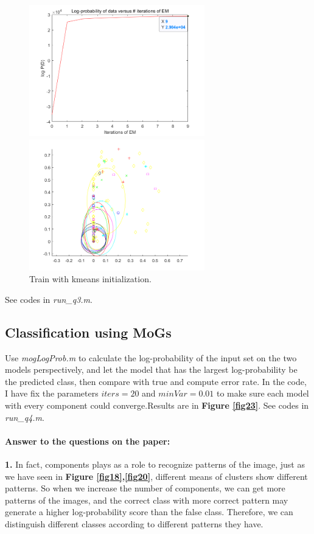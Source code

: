 \documentclass{article}
\begin{document}
\begin{figure}[H]
\begin{minipage}[t]{0.5\linewidth}
\centering
\includegraphics[width=3in]{figure22_1}
\end{minipage}%
\begin{minipage}[t]{0.5\linewidth}
\centering
\includegraphics[width=3in]{figure22_2}
\end{minipage}
\caption{Train with kmeans initialization.}
\label{fig22}
\end{figure}
See codes in \textit{run\_q3.m}.

\subsection{Classification using MoGs}
Use \textit{mogLogProb.m} to calculate the log-probability of the input set on the two models perspectively, and let the model that has the largest log-probability be the predicted class, then compare with true and compute error rate. In the code, I have fix the parameters $iters=20$ and $minVar=0.01$ to make sure each model with every component could converge.Results are in \textbf{Figure \ref{fig23}}. See codes in \textit{run\_q4.m}.\par


\paragraph{Answer to the questions on the paper:}\quad\par
\textbf{1.} In fact, components plays as a role to recognize patterns of the image, just as we have seen in \textbf{Figure \ref{fig18},\ref{fig20}}, different means of clusters show different patterns. So when we increase the number of components, we can get more patterns of the images, and the correct class with more correct pattern may generate a higher log-probability score than the false class. Therefore, we can distinguish different classes according to different patterns they have.\par
\end{document}
